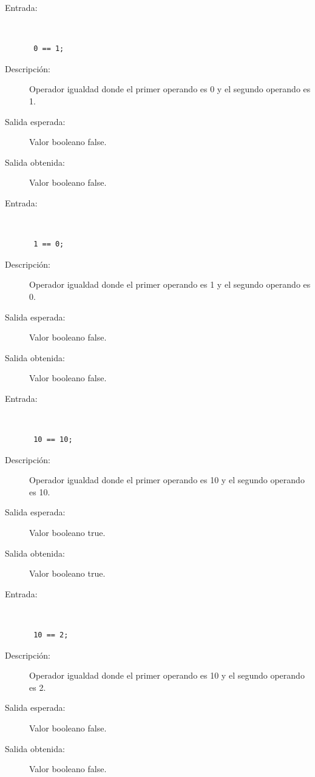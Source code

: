 \begin{framed}
	\begin{description}
		\item [Entrada:] \hfill \\
\begin{lstlisting}
 0 == 1;
\end{lstlisting}
		\item [Descripción:] Operador igualdad donde el primer operando es 0 y el segundo operando es  1.
		\item [Salida esperada:] Valor booleano false.
		\item [Salida obtenida:] Valor booleano false.
	\end{description}
\end{framed}

\begin{framed}
	\begin{description}
		\item [Entrada:] \hfill \\
\begin{lstlisting}
 1 == 0;
\end{lstlisting}
		\item [Descripción:] Operador igualdad donde el primer operando es 1 y el segundo operando es  0.
		\item [Salida esperada:] Valor booleano false.
		\item [Salida obtenida:] Valor booleano false.
	\end{description}
\end{framed}

\begin{framed}
	\begin{description}
		\item [Entrada:] \hfill \\
\begin{lstlisting}
 10 == 10;
\end{lstlisting}
		\item [Descripción:] Operador igualdad donde el primer operando es 10 y el segundo operando es  10.
		\item [Salida esperada:] Valor booleano true.
		\item [Salida obtenida:] Valor booleano true.
	\end{description}
\end{framed}

\begin{framed}
	\begin{description}
		\item [Entrada:] \hfill \\
\begin{lstlisting}
 10 == 2;
\end{lstlisting}
		\item [Descripción:] Operador igualdad donde el primer operando es 10 y el segundo operando es  2.
		\item [Salida esperada:] Valor booleano false.
		\item [Salida obtenida:] Valor booleano false.
	\end{description}
\end{framed}

